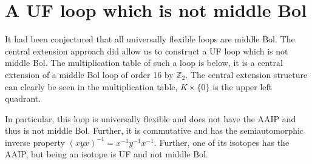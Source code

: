 \documentclass[12pt]{report}
\theoremstyle{definition}
\newcommand{\ZZZ}{\mathbb{Z}}
\begin{document}
\section{A UF loop which is not middle Bol}

It had been conjectured that all universally flexible loops are middle Bol. The central extension
  approach did allow us to construct a UF loop which is not middle Bol. The multiplication table
  of such a loop is below, it is a central extension of a middle Bol loop of order 16 by $\ZZZ_2$.
  The central extension structure can clearly be seen in the multiplication table, $K\times \{0\}$
  is the upper left quadrant.

In particular, this loop is universally flexible and does not have the AAIP and thus is not middle Bol.
  Further, it is commutative and has the semiautomorphic inverse property
  $(xyx)^{-1} = x^{-1} y^{-1} x^{-1}$. Further, one of its isotopes has the AAIP, but being an isotope
  is UF and not middle Bol.
\end{document}
